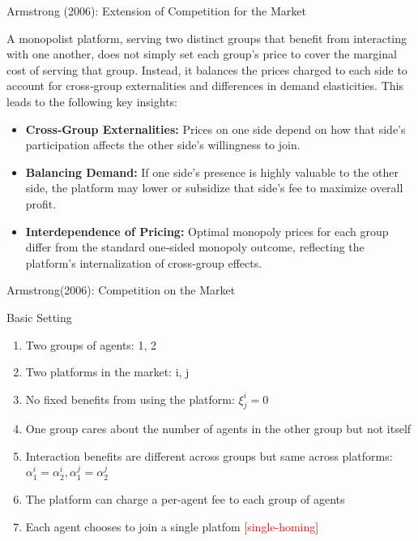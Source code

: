 \documentclass[aspectratio=169]{beamer}  %
\begin{document}
\begin{frame}{Armstrong (2006): Extension of Competition for the Market}
    \justifying  %
    
    A monopolist platform, serving two distinct groups that benefit from interacting 
    with one another, does not simply set each group’s price to cover the marginal 
    cost of serving that group. Instead, it balances the prices charged to each side 
    to account for cross‐group externalities and differences in demand elasticities.
    This leads to the following key insights:
    
    \begin{itemize}
        \item \textbf{Cross‐Group Externalities:} Prices on one side depend on how 
        that side’s participation affects the other side’s willingness to join.
    
        \item \textbf{Balancing Demand:} If one side’s presence is highly valuable 
        to the other side, the platform may lower or subsidize that side’s fee 
        to maximize overall profit.
    
        \item \textbf{Interdependence of Pricing:} Optimal monopoly prices for each 
        group differ from the standard one‐sided monopoly outcome, reflecting 
        the platform’s internalization of cross‐group effects.
    \end{itemize}
    
\end{frame}

\begin{frame}{Armstrong(2006): Competition on the Market}
    \begin{block}{Basic Setting}
        \begin{enumerate}
            \item Two groups of agents: 1, 2
            \item Two platforms in the market: i, j
            \item No fixed benefits from using the platform: $\xi_{j}^{i} = 0$
            \item One group cares about the number of agents in the other group but not itself
            \item Interaction benefits are different across groups but same across platforms: $\alpha_{1}^{i} = \alpha_{2}^{i}, \alpha_{1}^{j} = \alpha_{2}^{j}$
            \item The platform can charge a per-agent fee to each group of agents
            \item Each agent chooses to join a single platfom [\textcolor{red}{single-homing}]
        \end{enumerate}
    \end{block}
\end{frame}
\end{document}
